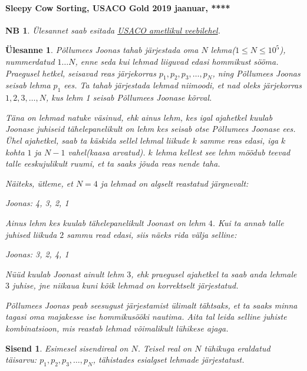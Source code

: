 \documentclass{trkut}
\newtheorem*{extra}{NB}
\newtheorem*{Input}{Sisend}
\newtheorem*{Text}{Ülesanne}
\begin{document}
\paragraph{Sleepy Cow Sorting, USACO Gold 2019 jaanuar, ****}
\begin{extra}
Ülesannet saab esitada \href{http://www.usaco.org/index.php?page=viewproblem2&cpid=898}{USACO ametlikul veebilehel}.
\end{extra}
\begin{Text}
Põllumees Joonas tahab järjestada oma $N$ lehma($1\le N\le 10^5$), nummerdatud $1…N$, enne seda kui lehmad liiguvad edasi hommikust sööma.
Praegusel hetkel, seisavad reas järjekorras $p_1,p_2,p_3,…,p_N$, ning Põllumees Joonas seisab lehma $p_1$ ees. Ta tahab järjestada lehmad niimoodi, et nad oleks järjekorras $1,2,3,…,N$, kus lehm 1 seisab Põllumees Joonase kõrval.

Täna on lehmad natuke väsinud, ehk ainus lehm, kes igal ajahetkel  kuulab Joonase juhiseid tähelepanelikult on lehm kes seisab otse Põllumees Joonase ees. Ühel ajahetkel, saab ta käskida sellel lehmal liikude $k$ samme reas edasi, iga $k$ kohta $1$ ja $N−1$ vahel(kaasa arvatud). $k$ lehma kellest see lehm möödub teevad talle eeskujulikult ruumi, et ta saaks jõuda reas nende taha.

Näiteks, ütleme, et $N=4$ ja lehmad on algselt reastatud järgnevalt:

Joonas: 4, 3, 2, 1 

Ainus lehm kes kuulab tähelepanelikult Joonast on lehm $4$. 
Kui ta annab talle juhised liikuda $2$ sammu read edasi, siis näeks rida välja selline:

Joonas: 3, 2, 4, 1 

Nüüd kuulab Joonast ainult lehm $3$, ehk praegusel ajahetkel ta saab anda lehmale $3$ juhise, jne niikaua kuni kõik lehmad on korrektselt järjestatud.

Põllumees Joonas peab seesugust järjestamist ülimalt tähtsaks, et ta saaks minna tagasi oma majakesse ise hommikusööki nautima. 
Aita tal leida selline juhiste kombinatsioon, mis reastab lehmad võimalikult lühikese ajaga.

\parencite{27}
\end{Text}

\begin{Input}
Esimesel sisendireal on  $N$. 
Teisel real on $N$ tühikuga eraldatud täisarvu: $p_1,p_2,p_3,…,p_N$, tähistades esialgset lehmade järjestatust.
\end{Input}
\end{document}
